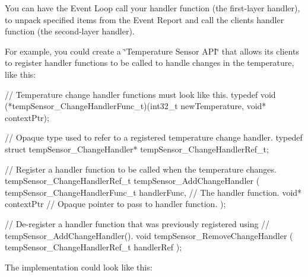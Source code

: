 You can have the Event Loop call your handler function (the first-\/layer handler), to unpack specified items from the Event Report and call the client\textquotesingle{}s handler function (the second-\/layer handler).

For example, you could create a \char`\"{}\+Temperature Sensor A\+P\+I\char`\"{} that allows its clients to register handler functions to be called to handle changes in the temperature, like this\+:


\begin{DoxyCode}
\textcolor{comment}{// Temperature change handler functions must look like this.}
\textcolor{keyword}{typedef} void (*tempSensor\_ChangeHandlerFunc\_t)(int32\_t newTemperature, \textcolor{keywordtype}{void}* contextPtr);

\textcolor{comment}{// Opaque type used to refer to a registered temperature change handler.}
\textcolor{keyword}{typedef} \textcolor{keyword}{struct }tempSensor\_ChangeHandler* tempSensor\_ChangeHandlerRef\_t;

\textcolor{comment}{// Register a handler function to be called when the temperature changes.}
tempSensor\_ChangeHandlerRef\_t tempSensor\_AddChangeHandler
(
    tempSensor\_ChangeHandlerFunc\_t  handlerFunc,  \textcolor{comment}{// The handler function.}
    \textcolor{keywordtype}{void}*                           contextPtr    \textcolor{comment}{// Opaque pointer to pass to handler function.}
);

\textcolor{comment}{// De-register a handler function that was previously registered using}
\textcolor{comment}{// tempSensor\_AddChangeHandler().}
\textcolor{keywordtype}{void} tempSensor\_RemoveChangeHandler
(
    tempSensor\_ChangeHandlerRef\_t  handlerRef
);
\end{DoxyCode}


The implementation could look like this\+:


